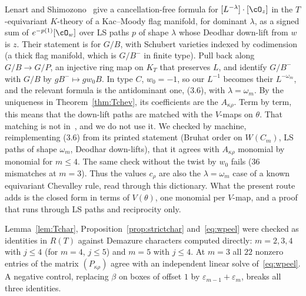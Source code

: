 \begin{remark}\label{rem:LS12}
Lenart and Shimozono~\cite[Cor.~3.4, eq.~(3.6)]{LS12} give a cancellation-free formula for
$[L^{-\lambda}]\cdot[\cO_z]$ in the $T$-equivariant $K$-theory of a Kac--Moody flag manifold, for dominant
$\lambda$, as a signed sum of $e^{-p(1)}[\cO_w]$ over LS paths $p$ of shape $\lambda$ whose Deodhar down-lift
from $w$ is $z$. Their statement is for $G/B$, with Schubert varieties indexed by codimension (a thick flag
manifold, which is $G/B^-$ in finite type). Pull back along $G/B\to G/P$, an injective ring map on $K_T$ that
preserves $L$, and identify $G/B^-$ with $G/B$ by $gB^-\mapsto gw_0B$. In type $C$, $w_0=-1$, so our $L^{-1}$
becomes their $L^{-\omega_m}$, and the relevant formula is the antidominant one, (3.6), with $\lambda=\omega_m$.
By the uniqueness in Theorem~\ref{thm:Tchev}, its coefficients are the $A_{\kappa\rho}$. Term by term,
this means that the down-lift paths are matched with the $V$-maps on $\theta$. That matching is not
in~\cite{LS12}, and we do not use it. We checked by machine, reimplementing (3.6) from its printed
statement (Bruhat order on $W(C_m)$, LS paths of shape $\omega_m$, Deodhar down-lifts), that it agrees with
$A_{\kappa\rho}$ monomial by monomial for $m\le4$. The same check without the twist by $w_0$ fails ($36$
mismatches at $m=3$). Thus the values $c_\rho$ are also the $\lambda=\omega_m$ case of a known equivariant
Chevalley rule, read through this dictionary. What the present route adds is the closed form in terms of
$V(\theta)$, one monomial per $V$-map, and a proof that runs through LS paths and reciprocity only.
\end{remark}

\begin{remark}\label{rem:Tchecks}
Lemma~\ref{lem:Tchar}, Proposition~\ref{prop:strictchar} and~\eqref{eq:wpeel} were checked as identities in
$R(T)$ against Demazure characters computed directly: $m=2,3,4$ with $j\le4$ (for $m=4$, $j\le5$) and $m=5$
with $j\le4$. At $m=3$ all $22$ nonzero entries of the matrix $(P_{\kappa\rho})$ agree with an
independent linear solve of~\eqref{eq:wpeel}. A negative control, replacing $\beta$ on boxes of offset $1$ by
$\varepsilon_{m-1}+\varepsilon_m$, breaks all three identities.
\end{remark}


